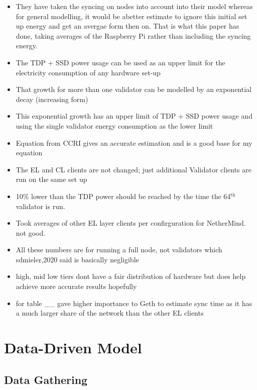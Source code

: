 \begin{itemize}
    \item They have taken the syncing on nodes into account into their model whereas for general modelling, it would be  abetter estimate to ignore this initial set up energy and get an avergae form then on. That is what this paper has done, taking averages of the Raspberry Pi rather than including the syncing energy.
    \item The TDP + SSD power usage can be used as an upper limit for the electricity consumption of any hardware set-up
    \item That growth for more than one validator can be modelled by an exponential decay (increasing form)
    \item This exponential growth has an upper limit of TDP + SSD power usage and using the single validator energy consumption as the lower limit
    \item Equation from CCRI gives an accurate estimation and is a good base for my equation
    \item The EL and CL clients are not changed; just additional Validator clients are run on the same set up
    \item 10\% lower than the TDP power should be reached by the time the 64$^\mathrm{{th}}$ validator is run.
    \item Took averages of other EL layer clients per confirguration for NetherMind. not good.
    \item All these numbers are for running a full node, not validators which sdmieler,2020 said is basically negligible
    \item high, mid low tiers dont have a fair distribution of hardware but does help achieve more accurate results hopefully
    \item for table \_\_ gave higher importance to Geth to estimate sync time as it has a much larger share of the network than the other EL clients
\end{itemize}


\section{ Data-Driven Model}
\subsection{Data Gathering}






